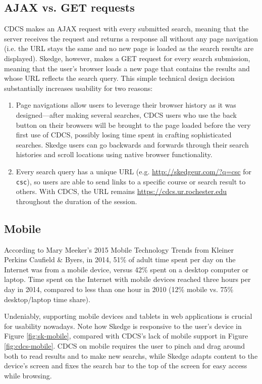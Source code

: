 \subsection{AJAX vs. GET requests}

CDCS makes an AJAX request with every submitted search, meaning that the server receives the request and returns a response all without any page navigation (i.e. the URL stays the same and no new page is loaded as the search results are displayed). Skedge, however, makes a GET request for every search submission, meaning that the user's browser loads a new page that contains the results and whose URL reflects the search query. This simple technical design decision substantially increases usability for two reasons:

\begin{enumerate}
  \item Page navigations allow users to leverage their browser history as it was designed---after making several searches, CDCS users who use the back button on their browsers will be brought to the page loaded before the very first use of CDCS, possibly losing time spent in crafting sophisticated searches. Skedge users can go backwards and forwards through their search histories and scroll locations using native browser functionality.
  \item Every search query has a unique URL (e.g. \url{http://skedgeur.com/?q=csc} for {\tt csc}), so users are able to send links to a specific course or search result to others. With CDCS, the URL remains \url{https://cdcs.ur.rochester.edu} throughout the duration of the session.
\end{enumerate}


\subsection{Mobile}

According to Mary Meeker's 2015 Mobile Technology Trends from Kleiner Perkins Caufield \& Byers\cite{kpcb}, in 2014, 51\% of adult time spent per day on the Internet was from a mobile device, versus 42\% spent on a desktop computer or laptop. Time spent on the Internet with mobile devices reached three hours per day in 2014, compared to less than one hour in 2010 (12\% mobile vs. 75\% desktop/laptop time share).

Undeniably, supporting mobile devices and tablets in web applications is crucial for usability nowadays. Note how Skedge is responsive to the user's device in Figure \ref{fig:sk-mobile}, compared with CDCS's lack of mobile support in Figure \ref{fig:cdcs-mobile}. CDCS on mobile requires the user to pinch and drag around both to read results and to make new searchs, while Skedge adapts content to the device's screen and fixes the search bar to the top of the screen for easy access while browsing.

